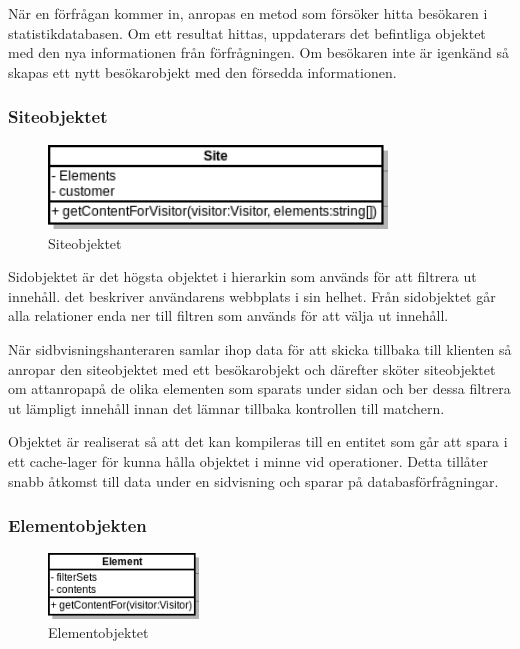 När en förfrågan kommer in, anropas en metod som försöker hitta besökaren i statistikdatabasen. Om ett resultat hittas, uppdaterars det befintliga objektet med den nya informationen från förfrågningen. Om besökaren inte är igenkänd så skapas ett nytt besökarobjekt med den försedda informationen.

\subsubsection{Siteobjektet}

\begin{figure}[h!]
\centering
\includegraphics[width=90mm]{assets/images/umlSite.png}
\caption{Siteobjektet}
\label{siteuml}
\end{figure}

Sidobjektet är det högsta objektet i hierarkin som används för att filtrera ut innehåll. det beskriver användarens webbplats i sin helhet. Från sidobjektet går alla relationer enda ner till filtren som används för att välja ut innehåll.

När sidbvisningshanteraren samlar ihop data för att skicka tillbaka till klienten så anropar den siteobjektet med ett besökarobjekt och därefter sköter siteobjektet om attanropapå de olika elementen som sparats under sidan och ber dessa filtrera ut lämpligt innehåll innan det lämnar tillbaka kontrollen till matchern.

Objektet är realiserat så att det kan kompileras till en entitet som går att spara i ett cache-lager för kunna hålla objektet i minne vid operationer. Detta tillåter snabb åtkomst till data under en sidvisning och sparar på databasförfrågningar.

\subsubsection{Elementobjekten}

\begin{figure}[h!]
\centering
\includegraphics[width=40mm]{assets/images/umlElement.png}
\caption{Elementobjektet}
\label{elementuml}
\end{figure}

